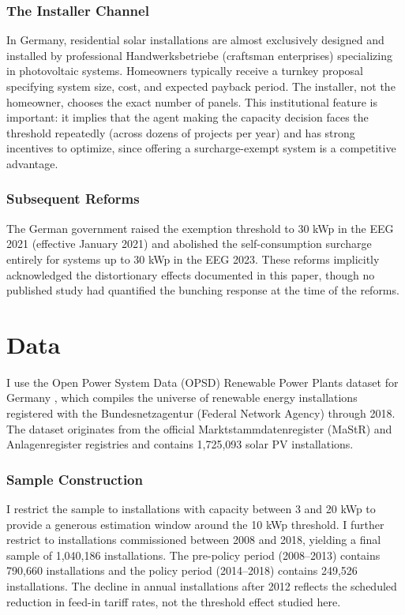 \documentclass[12pt]{article}
\begin{document}
\subsubsection*{The Installer Channel} In Germany, residential solar installations are almost exclusively designed and installed by professional Handwerksbetriebe (craftsman enterprises) specializing in photovoltaic systems. Homeowners typically receive a turnkey proposal specifying system size, cost, and expected payback period. The installer, not the homeowner, chooses the exact number of panels. This institutional feature is important: it implies that the agent making the capacity decision faces the threshold repeatedly (across dozens of projects per year) and has strong incentives to optimize, since offering a surcharge-exempt system is a competitive advantage.

\subsubsection*{Subsequent Reforms} The German government raised the exemption threshold to 30 kWp in the EEG 2021 (effective January 2021) and abolished the self-consumption surcharge entirely for systems up to 30 kWp in the EEG 2023. These reforms implicitly acknowledged the distortionary effects documented in this paper, though no published study had quantified the bunching response at the time of the reforms.


\section{Data}

I use the Open Power System Data (OPSD) Renewable Power Plants dataset for Germany \citep{opsd2020}, which compiles the universe of renewable energy installations registered with the Bundesnetzagentur (Federal Network Agency) through 2018. The dataset originates from the official Marktstammdatenregister (MaStR) and Anlagenregister registries and contains 1,725,093 solar PV installations.

\subsubsection*{Sample Construction} I restrict the sample to installations with capacity between 3 and 20 kWp to provide a generous estimation window around the 10 kWp threshold. I further restrict to installations commissioned between 2008 and 2018, yielding a final sample of 1,040,186 installations. The pre-policy period (2008--2013) contains 790,660 installations and the policy period (2014--2018) contains 249,526 installations. The decline in annual installations after 2012 reflects the scheduled reduction in feed-in tariff rates, not the threshold effect studied here.
\end{document}
